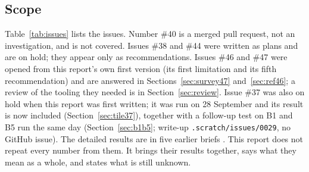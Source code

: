\documentclass[11pt,a4paper]{article}
\begin{document}
\subsection{Scope}
Table~\ref{tab:issues} lists the issues. Number \#40 is a merged pull request, not an investigation, and is not
covered. Issues \#38 and \#44 were written as plans and are on hold; they appear only as recommendations.
Issues \#46 and \#47 were opened from this report's own first version (its first limitation and its fifth
recommendation) and are answered in Sections~\ref{sec:survey47} and~\ref{sec:ref46}; a review of the tooling they
needed is in Section~\ref{sec:review}.
Issue \#37 was also on hold when this report was first written; it was run on 28 September and its result is
now included (Section~\ref{sec:tile37}), together with a follow-up test on B1 and B5 run the same day
(Section~\ref{sec:b1b5}; write-up \texttt{.scratch/issues/0029}, no GitHub issue). The detailed results are in five earlier briefs
\cite{b3134,b353639,b42,b43,b37}. This report does not repeat every
number from them. It brings their results together, says what they mean as a whole, and states what is still
unknown.
\end{document}
